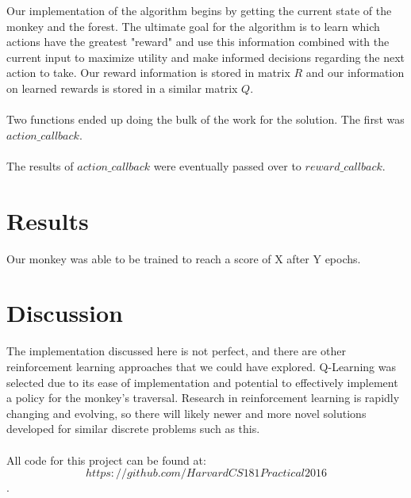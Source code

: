 \documentclass{article}
\begin{document}
Our implementation of the algorithm begins by getting the current state of the monkey and the forest. The ultimate goal for the algorithm is to learn which actions have the greatest "reward" and use this information combined with the current input to maximize utility and make informed decisions regarding the next action to take. Our reward information is stored in matrix $R$ and our information on learned rewards is stored in a similar matrix $Q$.\\\\
Two functions ended up doing the bulk of the work for the solution. The first was $action\_callback$.\\\\
The results of $action\_callback$ were eventually passed over to $reward\_callback$.
\section{Results}
Our monkey was able to be trained to reach a score of X after Y epochs. 

\section{Discussion}
The implementation discussed here is not perfect, and there are other reinforcement learning approaches that we could have explored. Q-Learning was selected due to its ease of implementation and potential to effectively implement a policy for the monkey's traversal. Research in reinforcement learning is rapidly changing and evolving, so there will likely newer and more novel solutions developed for similar discrete problems such as this.\\\\
All code for this project can be found at: $$https://github.com/HarvardCS181Practical2016$$.
\end{document}
